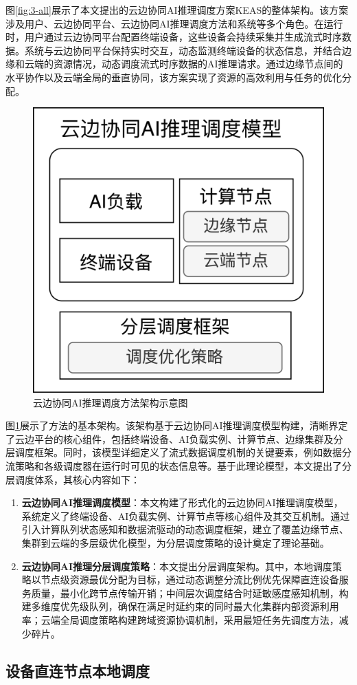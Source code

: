 图\ref{fig:3-all}展示了本文提出的云边协同AI推理调度方案KEAS的整体架构。该方案涉及用户、云边协同平台、云边协同AI推理调度方法和系统等多个角色。在运行时，用户通过云边协同平台配置终端设备，这些设备会持续采集并生成流式时序数据。系统与云边协同平台保持实时交互，动态监测终端设备的状态信息，并结合边缘和云端的资源情况，动态调度流式时序数据的AI推理请求。通过边缘节点间的水平协作以及云端全局的垂直协同，该方案实现了资源的高效利用与任务的优化分配。

\begin{figure}[ht]
  \centering
  \includegraphics[width=0.4\linewidth]{pics/3-0架构.png}
  \caption{云边协同AI推理调度方法架构示意图}
  \label{fig:3-0arch}
\end{figure}

图\ref{fig:3-0arch}展示了方法的基本架构。该架构基于云边协同AI推理调度模型构建，清晰界定了云边平台的核心组件，包括终端设备、AI负载实例、计算节点、边缘集群及分层调度框架。同时，该模型详细定义了流式数据调度机制的关键要素，例如数据分流策略和各级调度器在运行时可见的状态信息等。基于此理论模型，本文提出了分层调度体系，其核心内容如下：

\begin{enumerate}
    \item \textbf{云边协同AI推理调度模型}：本文构建了形式化的云边协同AI推理调度模型，系统定义了终端设备、AI负载实例、计算节点等核心组件及其交互机制。通过引入计算队列状态感知和数据流驱动的动态调度框架，建立了覆盖边缘节点、集群到云端的多层级优化模型，为分层调度策略的设计奠定了理论基础。
    \item \textbf{云边协同AI推理分层调度策略}：本文提出分层调度架构。其中，本地调度策略以节点级资源最优分配为目标，通过动态调整分流比例优先保障直连设备服务质量，最小化跨节点传输开销；中间层次调度结合时延敏感度感知机制，构建多维度优先级队列，确保在满足时延约束的同时最大化集群内部资源利用率；云端全局调度策略构建跨域资源协调机制，采用最短任务先调度方法，减少碎片。
\end{enumerate}



\subsection{设备直连节点本地调度}


